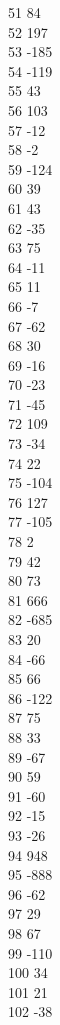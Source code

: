{ 51	84 \\
 52	197 \\
 53	-185 \\
 54	-119 \\
 55	43 \\
 56	103 \\
 57	-12 \\
 58	-2 \\
 59	-124 \\
 60	39 \\
 61	43 \\
 62	-35 \\
 63	75 \\
 64	-11 \\
 65	11 \\
 66	-7 \\
 67	-62 \\
 68	30 \\
 69	-16 \\
 70	-23 \\
 71	-45 \\
 72	109 \\
 73	-34 \\
 74	22 \\
 75	-104 \\
 76	127 \\
 77	-105 \\
 78	2 \\
 79	42 \\
 80	73 \\
 81	666 \\
 82	-685 \\
 83	20 \\
 84	-66 \\
 85	66 \\
 86	-122 \\
 87	75 \\
 88	33 \\
 89	-67 \\
 90	59 \\
 91	-60 \\
 92	-15 \\
 93	-26 \\
 94	948 \\
 95	-888 \\
 96	-62 \\
 97	29 \\
 98	67 \\
 99	-110 \\
 100	34 \\
 101	21 \\
 102	-38 \\
}
